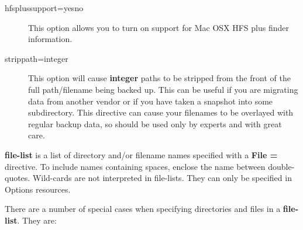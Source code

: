 \begin{description}
\item [hfsplussupport=yes\vb{}no]
   This option allows you to turn on support for Mac OSX HFS plus 
   finder information.

\item [strippath=\lt{}integer\gt{}]
   This option will cause {\bf integer} paths to be stripped from
   the front of the full path/filename being backed up. This can
   be useful if you are migrating data from another vendor or if
   you have taken a snapshot into some subdirectory.  This directive
   can cause your filenames to be overlayed with regular backup data,
   so should be used only by experts and with great care.
\end{description}

{\bf \lt{}file-list\gt{}} is a list of directory and/or filename names
specified with a {\bf File =} directive. To include names containing spaces,
enclose the name between double-quotes. Wild-cards are not interpreted
in file-lists. They can only be specified in Options resources.

There are a number of special cases when specifying directories and files in a
{\bf file-list}. They are: 

